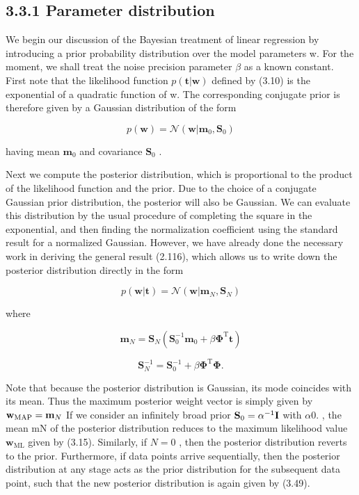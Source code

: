 \documentclass[
  10
]{article}
\begin{document}
\subsection{3.3.1 Parameter distribution}\label{parameter-distribution}

We begin our discussion of the Bayesian treatment of linear regression
by introducing a prior probability distribution over the model
parameters w. For the moment, we shall treat the noise precision
parameter \(\beta\) as a known constant. First note that the likelihood
function \(p ( \mathbf { t } | \mathbf { w } )\) defined by (3.10) is
the exponential of a quadratic function of w. The corresponding
conjugate prior is therefore given by a Gaussian distribution of the
form

\[
p (\mathbf {w}) = \mathcal {N} (\mathbf {w} | \mathbf {m} _ {0}, \mathbf {S} _ {0})\tag{3.48}
\]

having mean \(\mathbf { m } _ { 0 }\) and covariance
\(\mathbf { S } _ { 0 }\) .

Next we compute the posterior distribution, which is proportional to the
product of the likelihood function and the prior. Due to the choice of a
conjugate Gaussian prior distribution, the posterior will also be
Gaussian. We can evaluate this distribution by the usual procedure of
completing the square in the exponential, and then finding the
normalization coefficient using the standard result for a normalized
Gaussian. However, we have already done the necessary work in deriving
the general result (2.116), which allows us to write down the posterior
distribution directly in the form

\[
p (\mathbf {w} | \mathbf {t}) = \mathcal {N} (\mathbf {w} | \mathbf {m} _ {N}, \mathbf {S} _ {N})\tag{3.49}
\]

where

\[
\mathbf {m} _ {N} = \mathbf {S} _ {N} \left(\mathbf {S} _ {0} ^ {- 1} \mathbf {m} _ {0} + \beta \boldsymbol {\Phi} ^ {\mathrm{T}} \mathbf {t}\right)\tag{3.50}
\]

\[
{\mathbf S} _ {N} ^ {- 1} = {\mathbf S} _ {0} ^ {- 1} + \beta {\mathbf \Phi} ^ {\mathrm{T}} {\mathbf \Phi}.\tag{3.51}
\]

Note that because the posterior distribution is Gaussian, its mode
coincides with its mean. Thus the maximum posterior weight vector is
simply given by
\({ \bf w } _ { \mathrm { M A P } } = { \bf m } _ { N }\) If we consider
an infinitely broad prior
\({ \bf S } _ { 0 } = \alpha ^ { - 1 } { \bf I }\) with \(\alpha  0 .\)
, the mean mN of the posterior distribution reduces to the maximum
likelihood value \(\mathbf { w } _ { \mathrm { M L } }\) given by
(3.15). Similarly, if \(N = 0\) , then the posterior distribution
reverts to the prior. Furthermore, if data points arrive sequentially,
then the posterior distribution at any stage acts as the prior
distribution for the subsequent data point, such that the new posterior
distribution is again given by (3.49).
\end{document}
